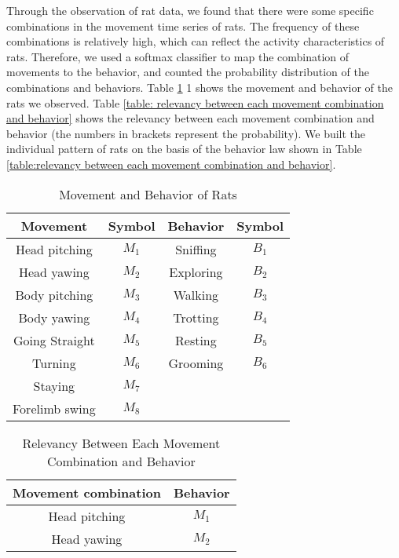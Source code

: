 Through the observation of rat data, we found that there were some specific
combinations in the movement time series of rats. The frequency of these
combinations is relatively high, which can reflect the activity characteristics
of rats. Therefore, we used a softmax classifier to map the combination of
movements to the behavior, and counted the probability distribution of the
combinations and behaviors. Table \ref{table:movement and behavior of rats} 1
shows the movement and behavior of the rats we observed. Table \ref{table:
relevancy between each movement combination and behavior} shows the relevancy
between each movement combination and behavior (the numbers in brackets
represent the probability). We built the individual pattern of rats on the basis
of the behavior law shown in Table \ref{table:relevancy between each movement
combination and behavior}.
\begin{table}[b]
    \caption{Movement and Behavior of Rats}
    \centering
    \begin{tabular}{cccc}
            \hline
            Movement & Symbol & Behavior & Symbol \\
            \hline
            Head pitching & $M_1$ & Sniffing & $B_1$ \\
            Head yawing & $M_2$ & Exploring & $B_2$ \\
            Body pitching & $M_3$ & Walking & $B_3$ \\
            Body yawing & $M_4$ & Trotting & $B_4$ \\
            Going Straight & $M_5$ & Resting & $B_5$ \\
            Turning & $M_6$ & Grooming & $B_6$ \\
            Staying & $M_7$ & & \\
            Forelimb swing & $M_8$ & & \\
            \hline
            \end{tabular}
    \label{table:movement and behavior of rats}
\end{table}

\begin{table}[b]
    \caption{Relevancy Between Each Movement Combination and Behavior}
    \centering
    \begin{tabular}{cc}
            \hline
            Movement combination & Behavior \\
            \hline
            Head pitching & $M_1$ \\
            Head yawing & $M_2$ \\
            \hline
            \end{tabular}
    \label{table:relevancy between each movement combination and behavior}
\end{table}

